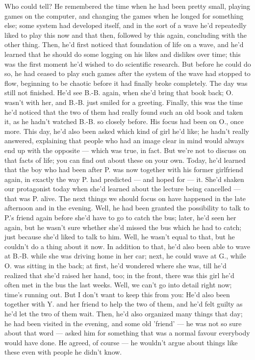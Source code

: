 Who could tell? He remembered the time when he had been pretty small, playing games on the computer, and changing the games when he longed for something else; some system had developed itself, and in the sort of a wave he'd repeatedly liked to play this now and that then, followed by this again, concluding with the other thing. Then, he'd first noticed that foundation of life on a wave, and he'd learned that he should do some logging on his likes and dislikes over time; this was the first moment he'd wished to do scientific research. But before he could do so, he had ceased to play such games after the system of the wave had stopped to flow, beginning to be chaotic before it had finally broke completely. 
The day was still not finished. 
He'd see B.-B. again, when she'd bring that book back; O. wasn't with her, and B.-B. just smiled for a greeting. Finally, this was the time he'd noticed that the two of them had really found such an old book and taken it, as he hadn't watched B.-B. so closely before. His focus had been on O., once more. 
This day, he'd also been asked which kind of girl he'd like; he hadn't really answered, explaining that people who had an image clear in mind would always end up with the opposite --- which was true, in fact. 
But we're not to discuss on that facts of life; you can find out about these on your own. 
Today, he'd learned that the boy who had been after P. was now together with his former girlfriend again, in exactly the way P. had predicted --- and hoped for --- it. She'd shaken our protagonist today when she'd learned about the lecture being cancelled --- that was P. alive. 
The next things we should focus on have happened in the late afternoon and in the evening. Well, he had been granted the possibility to talk to P.'s friend again before she'd have to go to catch the bus; later, he'd seen her again, but he wasn't sure whether she'd missed the bus which he had to catch; just because she'd liked to talk to him. Well, he wasn't equal to that, but he couldn't do a thing about it now. 
In addition to that, he'd also been able to wave at B.-B. while she was driving home in her car; next, he could wave at G., while O. was sitting in the back; at first, he'd wondered where she was, till he'd realized that she'd raised her hand, too; in the front, there was this girl he'd often met in the bus the last weeks. 
Well, we can't go into detail right now; time's running out. 
But I don't want to keep this from you: He'd also been together with Y. and her friend to help the two of them, and he'd felt guilty as he'd let the two of them wait. Then, he'd also organized many things that day; he had been visited in the evening, and some old 'friend' --- he was not so sure about that word --- asked him for something that was a normal favour everybody would have done. He agreed, of course --- he wouldn't argue about things like these even with people he didn't know. 
